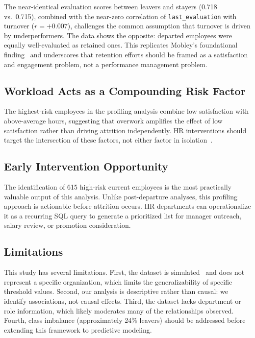 \documentclass[conference]{IEEEtran}
\begin{document}
The near-identical evaluation scores between leavers and stayers (0.718
vs.\ 0.715), combined with the near-zero correlation of \texttt{last\_evaluation}
with turnover ($r = +0.007$), challenges the common assumption that turnover
is driven by underperformers. The data shows the opposite: departed employees
were equally well-evaluated as retained ones. This replicates Mobley's
foundational finding~\cite{mobley1977} and underscores that retention efforts
should be framed as a satisfaction and engagement problem, not a performance
management problem.

\subsection{Workload Acts as a Compounding Risk Factor}

The highest-risk employees in the profiling analysis combine low satisfaction
with above-average hours, suggesting that overwork amplifies the effect of low
satisfaction rather than driving attrition independently. HR interventions
should target the intersection of these factors, not either factor in
isolation~\cite{hom2017}.

\subsection{Early Intervention Opportunity}

The identification of 615 high-risk current employees is the most practically
valuable output of this analysis. Unlike post-departure analyses, this
profiling approach is actionable before attrition occurs. HR departments can
operationalize it as a recurring SQL query to generate a prioritized list for
manager outreach, salary review, or promotion consideration.

\subsection{Limitations}

This study has several limitations. First, the dataset is simulated~\cite{kaggle}
and does not represent a specific organization, which limits the
generalizability of specific threshold values. Second, our analysis is
descriptive rather than causal: we identify associations, not causal effects.
Third, the dataset lacks department or role information, which likely moderates
many of the relationships observed. Fourth, class imbalance (approximately
24\% leavers) should be addressed before extending this framework to predictive
modeling.
\end{document}
